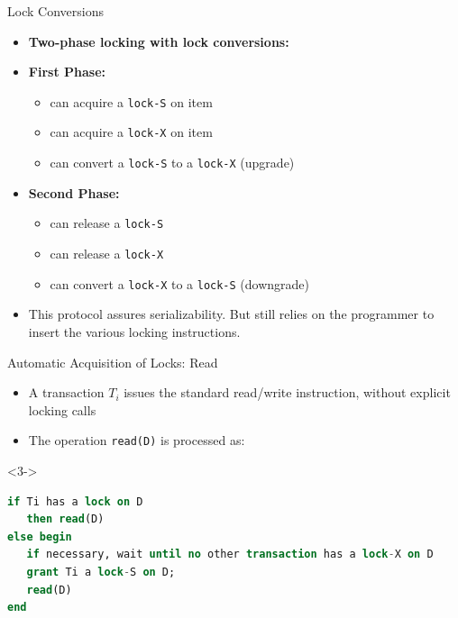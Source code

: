\documentclass[aspectratio=169, xcolor=dvipsnames]{beamer}
\begin{document}
\begin{frame}{Lock Conversions}
    \begin{itemize}[<+->]
        \item \textbf{Two-phase locking with lock conversions:}
        \item \textbf{First Phase:}
        \begin{itemize}
            \item[$\triangleright$] can acquire a \texttt{lock-S} on item
            \item[$\triangleright$] can acquire a \texttt{lock-X} on item
            \item[$\triangleright$] can convert a \texttt{lock-S} to a \texttt{lock-X} (upgrade)
        \end{itemize}
        \item \textbf{Second Phase:}
        \begin{itemize}
            \item[$\triangleright$] can release a \texttt{lock-S}
            \item[$\triangleright$] can release a \texttt{lock-X}
            \item[$\triangleright$] can convert a \texttt{lock-X} to a \texttt{lock-S} (downgrade)
        \end{itemize}
        \item This protocol assures serializability. But still relies on the programmer to insert the various locking instructions.
    \end{itemize}
\end{frame}

\begin{frame}[fragile]{Automatic Acquisition of Locks: Read}
    \begin{itemize}[<+->]
        \item A transaction $T_i$ issues the standard read/write instruction, without explicit locking calls
        \item The operation \texttt{read(D)} is processed as:
    \end{itemize}
    \begin{onlyenv}<3->
        \begin{lstlisting}[language=SQL]
if Ti has a lock on D
   then read(D)
else begin 
   if necessary, wait until no other transaction has a lock-X on D
   grant Ti a lock-S on D; 
   read(D)
end
        \end{lstlisting}
    \end{onlyenv}
\end{frame}
\end{document}
